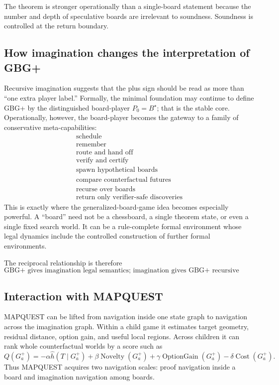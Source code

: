 \documentclass[11pt]{article}
\begin{document}
The theorem is stronger operationally than a single-board statement because the number and depth of speculative boards are irrelevant to soundness.  Soundness is controlled at the return boundary.

\subsection{How imagination changes the interpretation of GBG+}

Recursive imagination suggests that the plus sign should be read as more than ``one extra player label.''  Formally, the minimal foundation may continue to define GBG+ by the distinguished board-player $P_0=B^\star$; that is the stable core.  Operationally, however, the board-player becomes the gateway to a family of conservative meta-capabilities:
\[
\boxed{
\begin{array}{c}
\text{schedule}\\
\text{remember}\\
\text{route and hand off}\\
\text{verify and certify}\\
\text{spawn hypothetical boards}\\
\text{compare counterfactual futures}\\
\text{recurse over boards}\\
\text{return only verifier-safe discoveries}
\end{array}}
\]
This is exactly where the generalized-board-game idea becomes especially powerful.  A ``board'' need not be a chessboard, a single theorem state, or even a single fixed search world.  It can be a rule-complete formal environment whose legal dynamics include the controlled construction of further formal environments.

The reciprocal relationship is therefore
\[
\boxed{
\text{GBG+ gives imagination legal semantics; imagination gives GBG+ recursive counterfactual reach.}
}
\]

\subsection{Interaction with MAPQUEST}

MAPQUEST can be lifted from navigation inside one state graph to navigation across the imagination graph.  Within a child game it estimates target geometry, residual distance, option gain, and useful local regions.  Across children it can rank whole counterfactual worlds by a score such as
\[
Q(G^+_a)=
-\alpha\widehat h(T\mid G^+_a)
+\beta\operatorname{Novelty}(G^+_a)
+\gamma\operatorname{OptionGain}(G^+_a)
-\delta\operatorname{Cost}(G^+_a).
\]
Thus MAPQUEST acquires two navigation scales: proof navigation inside a board and imagination navigation among boards.
\end{document}
